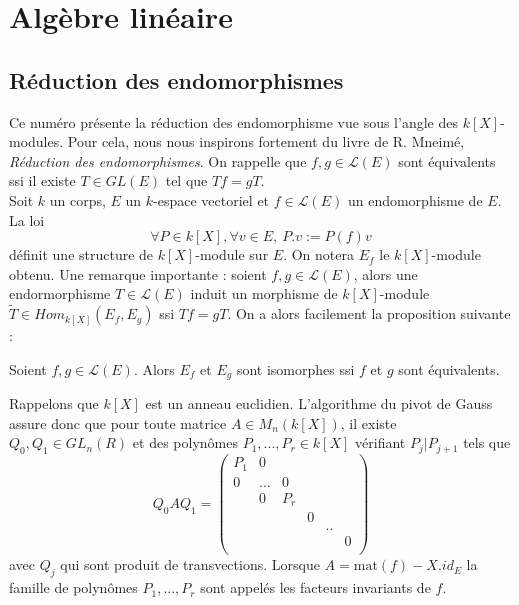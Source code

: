 \section{Algèbre linéaire}

\subsection{Réduction des endomorphismes}

Ce numéro présente la réduction des endomorphisme vue sous l'angle des $k[X]$-modules. Pour cela, nous nous inspirons fortement du livre de R. Mneimé, \textit{Réduction des endomorphismes}\cite{mneimnereduction}. On rappelle que $f,g\in \mathcal L(E)$ sont équivalents ssi il existe $T\in GL(E)$ tel que $Tf=gT$.\\

Soit $k$ un corps, $E$ un $k$-espace vectoriel et $f\in \mathcal L(E)$ un endomorphisme de $E$. La loi
\[\forall P\in k[X],\forall v\in E, \ P.v :=P(f)v\]
définit une structure de $k[X]$-module sur $E$. On notera $E_f$ le $k[X]$-module obtenu. Une remarque importante : soient $f,g\in \mathcal L(E)$, alors une endormorphisme $T\in \mathcal L(E)$ induit un morphisme de $k[X]$-module $\tilde T\in Hom_{k[X]}(E_f,E_g)$ ssi $Tf=gT$. On a alors facilement la proposition suivante :

\begin{prop}
Soient $f,g\in \mathcal L(E)$. Alors $E_f$ et $E_g$ sont isomorphes ssi $f$ et $g$ sont équivalents.
\end{prop}

Rappelons que $k[X]$ est un anneau euclidien. L'algorithme du pivot de Gauss assure donc que pour toute matrice $A\in M_n(k[X])$, il existe $Q_0,Q_1\in GL_n(R)$ et des polynômes $P_1,...,P_r\in k[X]$ vérifiant $P_j|P_{j+1}$ tels que 
\[Q_0AQ_1= \begin{pmatrix} 
P_1 & 0 &     &   &  & \\
0 &... & 0    &   &  & \\
  &   0  & P_r &   &  & \\
  &    &      & 0 &  &  \\
  &    &      &   & ..  &  \\
  &    &      &    &  & 0\\
\end{pmatrix}\]
avec $Q_j$ qui sont produit de transvections. Lorsque $A = \text{mat}(f)-X.id_E$ la famille de polynômes $P_1,...,P_r$ sont appelés les facteurs invariants de $f$.\\

